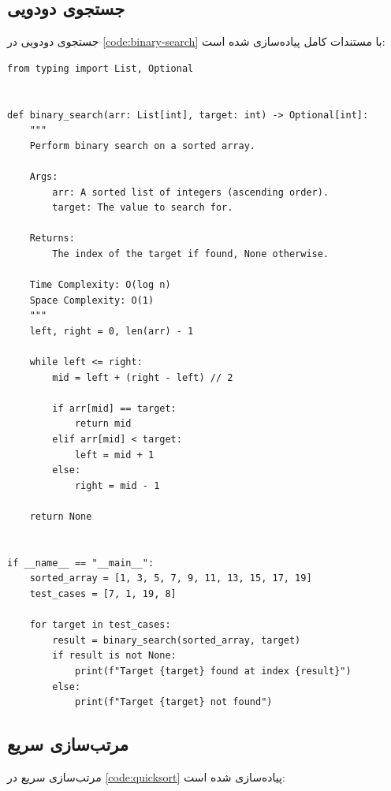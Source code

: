 \documentclass{matinbook}
\begin{document}
\subsection{جستجوی دودویی}
\label{sec:algorithms-binary}

جستجوی دودویی در \cref{code:binary-search} با مستندات
کامل پیاده‌سازی شده است:

\begin{latin}
\begin{verbatim}
from typing import List, Optional


def binary_search(arr: List[int], target: int) -> Optional[int]:
    """
    Perform binary search on a sorted array.

    Args:
        arr: A sorted list of integers (ascending order).
        target: The value to search for.

    Returns:
        The index of the target if found, None otherwise.

    Time Complexity: O(log n)
    Space Complexity: O(1)
    """
    left, right = 0, len(arr) - 1

    while left <= right:
        mid = left + (right - left) // 2

        if arr[mid] == target:
            return mid
        elif arr[mid] < target:
            left = mid + 1
        else:
            right = mid - 1

    return None


if __name__ == "__main__":
    sorted_array = [1, 3, 5, 7, 9, 11, 13, 15, 17, 19]
    test_cases = [7, 1, 19, 8]

    for target in test_cases:
        result = binary_search(sorted_array, target)
        if result is not None:
            print(f"Target {target} found at index {result}")
        else:
            print(f"Target {target} not found")
\end{verbatim}
\end{latin}
\label{code:binary-search}

\subsection{مرتب‌سازی سریع}
\label{sec:algorithms-quicksort}

مرتب‌سازی سریع در \cref{code:quicksort} پیاده‌سازی شده است:
\end{document}
